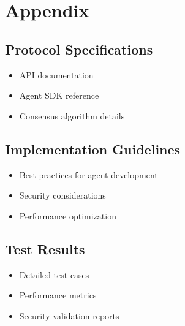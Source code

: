 \documentclass[11pt,twocolumn]{article}
\begin{document}
\section{Appendix}

\subsection{Protocol Specifications}
\begin{itemize}
  \item API documentation
  \item Agent SDK reference
  \item Consensus algorithm details
\end{itemize}

\subsection{Implementation Guidelines}
\begin{itemize}
  \item Best practices for agent development
  \item Security considerations
  \item Performance optimization
\end{itemize}

\subsection{Test Results}
\begin{itemize}
  \item Detailed test cases
  \item Performance metrics
  \item Security validation reports
\end{itemize}
\end{document}
